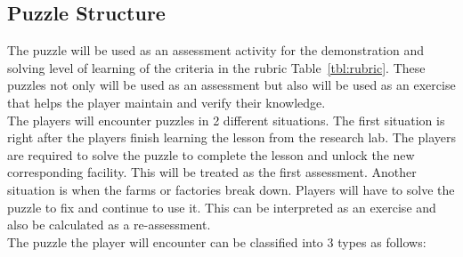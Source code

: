 \documentclass[12pt,oneside,openright,a4paper]{cpe-english-project}
\begin{document}
\subsection{Puzzle Structure}
The puzzle will be used as an assessment activity for the demonstration and solving level of learning of the criteria in the rubric Table~\ref{tbl:rubric}. These puzzles not only will be used as an assessment but also will be used as an exercise that helps the player maintain and verify their knowledge. \\
The players will encounter puzzles in 2 different situations. The first situation is right after the players finish learning the lesson from the research lab. The players are required to solve the puzzle to complete the lesson and unlock the new corresponding facility. This will be treated as the first assessment. Another situation is when the farms or factories break down. Players will have to solve the puzzle to fix and continue to use it. This can be interpreted as an exercise and also be calculated as a re-assessment. \\
The puzzle the player will encounter can be classified into 3 types as follows: \\
\end{document}
